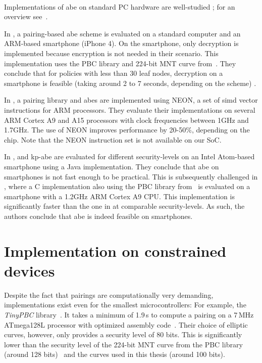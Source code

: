~

Implementations of \acrshort{abe} on standard PC hardware are well-studied \cite{akinyele_charm_2013,bethencourt_ciphertext-policy_2007,green_functional_nodate}; for an overview see~\cite{zickau_applied_2016}.

In \cite{akinyele_self-protecting_2010}, a pairing-based \acrshort{abe} scheme is evaluated on a standard computer and an ARM-based smartphone (iPhone 4).
On the smartphone, only decryption is implemented because encryption is not needed in their scenario.
This implementation uses the PBC library and 224-bit MNT curve from~\cite{lynn_implementation_2007}.
They conclude that for policies with less than 30 leaf nodes, decryption on a smartphone is feasible (taking around 2 to 7 seconds, depending on the scheme) \cite{akinyele_self-protecting_2010}.

In \cite{sanchez_neon_2013}, a pairing library and \acrshort{abes} are implemented using NEON, a set of \acrshort{simd} vector instructions for ARM processors.
They evaluate their implementations on several ARM Cortex A9 and A15 processors with clock frequencies between 1GHz and 1.7GHz.
The use of NEON improves performance by 20-50\%, depending on the chip.
Note that the NEON instruction set is not available on our SoC. 

In \cite{wang_performance_2014},  and \acrshort{kp-abe} are evaluated for different \glspl{security-level} on an Intel Atom-based smartphone using a Java implementation.
They conclude that \acrshort{abe} on smartphones is not fast enough to be practical.
This is subsequently challenged in \cite{ambrosin_feasibility_2015}, where a C implementation also using the PBC library from~\cite{lynn_implementation_2007} is evaluated on a smartphone with a 1.2GHz ARM Cortex A9 CPU.
This implementation is significantly faster than the one in \cite{wang_performance_2014} at comparable \glspl{security-level}.
As such, the authors conclude that \acrshort{abe} is indeed feasible on smartphones.

\section{Implementation on constrained devices}

Despite the fact that pairings are computationally very demanding, implementations exist even for the smallest microcontrollers:
For example, the \emph{TinyPBC} library~\cite{aranha_tinypbc_nodate}.
It takes a minimum of 1.9\,s to compute a pairing on a 7\,MHz ATmega128L processor with optimized assembly code~\cite{oliveira_tinypbc_2011}. 
Their choice of elliptic curves, however, only provides a security level of 80 bits.
This is significantly lower than the security level of the 224-bit MNT curve from the PBC library (around 128 bits)~\cite{akinyele_self-protecting_2010} and the curves used in this thesis (around 100 bits).

